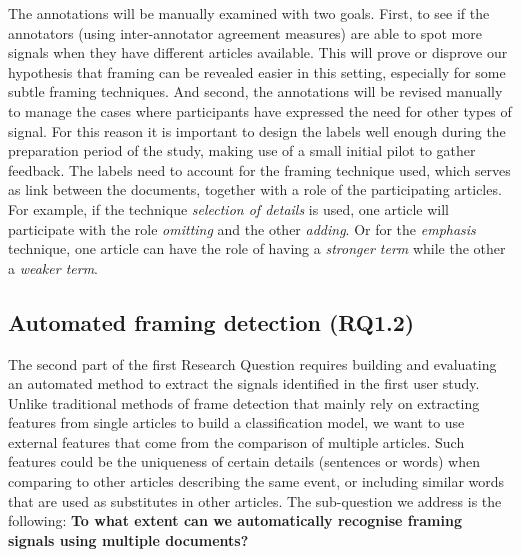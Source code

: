 

The annotations will be manually examined with two goals.
First, to see if the annotators (using inter-annotator agreement measures) are able to spot more signals when they have different articles available.
This will prove or disprove our hypothesis that framing can be revealed easier in this setting, especially for some subtle framing techniques.
And second, the annotations will be revised manually to manage the cases where participants have expressed the need for other types of signal.
For this reason it is important to design the labels well enough during the preparation period of the study, making use of a small initial pilot to gather feedback.
The labels need to account for the framing technique used, which serves as link between the documents, together with a role of the participating articles.
For example, if the technique \emph{selection of details} is used, one article will participate with the role \emph{omitting} and the other \emph{adding}.
Or for the \emph{emphasis} technique, one article can have the role of having a \emph{stronger term} while the other a \emph{weaker term}. 



\subsection{Automated framing detection (RQ1.2)}

The second part of the first Research Question requires building and evaluating an automated method to extract the signals identified in the first user study.
Unlike traditional methods of frame detection that mainly rely on extracting features from single articles to build a classification model, we want to use external features that come from the comparison of multiple articles. Such features could be the uniqueness of certain details (sentences or words) when comparing to other articles describing the same event, or including similar words that are used as substitutes in other articles.
The sub-question we address is the following:
\textbf{To what extent can we automatically recognise framing signals using multiple documents?}

